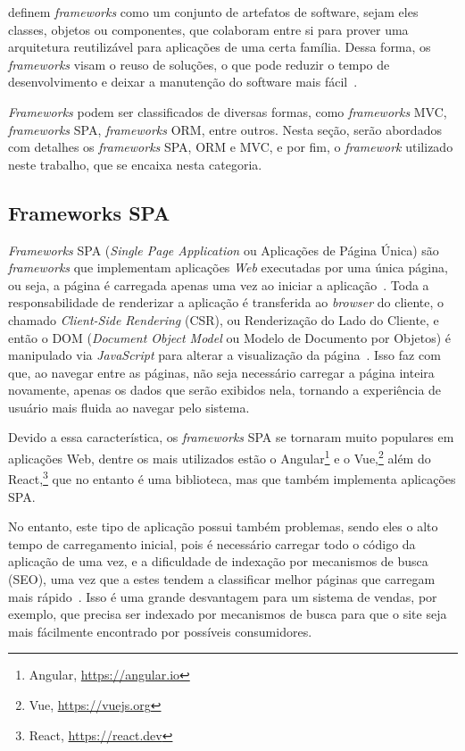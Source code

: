  definem \textit{frameworks} como um conjunto de artefatos de software, sejam eles
classes, objetos ou componentes, que colaboram entre si para prover uma arquitetura reutilizável
para aplicações de uma certa família. Dessa forma, os \textit{frameworks} visam o reuso de soluções, o que
pode reduzir o tempo de desenvolvimento e deixar a manutenção do software mais fácil~\cite{gamma:2000}.

\textit{Frameworks} podem ser classificados de diversas formas, como \textit{frameworks} MVC,
\textit{frameworks} SPA, \textit{frameworks} ORM, entre outros. Nesta seção, serão abordados
com detalhes os \textit{frameworks} SPA, ORM e MVC, e por fim, o \textit{framework} utilizado neste trabalho,
que se encaixa nesta categoria.

\subsection{Frameworks SPA}
\label{sec-fundteo-framework-spa}

\textit{Frameworks} SPA (\textit{Single Page Application} ou Aplicações de Página Única) são \textit{frameworks} que implementam
aplicações \textit{Web} executadas por uma única página, ou seja, a página é carregada apenas uma vez 
ao iniciar a aplicação~\cite{emmitt:2015}. Toda a responsabilidade de renderizar a aplicação é
transferida ao \textit{browser} do cliente, o chamado \textit{Client-Side Rendering} (CSR), ou Renderização do Lado do Cliente,
e então o DOM (\textit{Document Object Model} ou Modelo de Documento por Objetos) é manipulado via \textit{JavaScript} para alterar a visualização da 
página~\cite{emmitt:2015,konshin:2018}. Isso faz com que, ao navegar entre as páginas, não 
seja necessário carregar a página inteira novamente, apenas os dados que serão exibidos nela, 
tornando a experiência de usuário mais fluida ao navegar pelo sistema. 

Devido a essa característica, os \textit{frameworks} SPA se tornaram muito populares em aplicações
Web, dentre os mais utilizados estão o Angular\footnote{Angular, \url{https://angular.io}}
e o Vue,\footnote{Vue, \url{https://vuejs.org}} além do React,\footnote{React, \url{https://react.dev}}
que no entanto é uma biblioteca, mas que também implementa aplicações SPA.

No entanto, este tipo de aplicação possui também problemas, sendo eles o alto tempo de carregamento
inicial, pois é necessário carregar todo o código da aplicação de uma vez, e a dificuldade de
indexação por mecanismos de busca (SEO), uma vez que a estes tendem a classificar melhor
páginas que carregam mais rápido~\cite{konshin:2018}. Isso é uma grande desvantagem para um sistema
de vendas, por exemplo, que precisa ser indexado por mecanismos de busca para que o site seja mais
fácilmente encontrado por possíveis consumidores.

